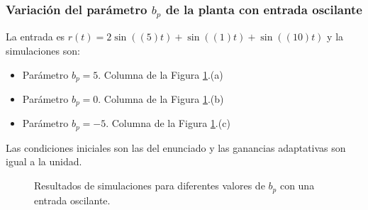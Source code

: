 \documentclass[letterpaper,11pt]{article} %
\begin{document}
\subsubsection{Variación del parámetro $b_p$ de la planta con entrada oscilante}
La entrada es $r(t) = 2\sin((5)t) + \sin((1)t) + \sin((10)t)$ y la simulaciones son:
\begin{itemize}
	\item Parámetro $b_p = 5$. Columna de la Figura \ref{parametrobO}.(a)
	\item Parámetro $b_p = 0$. Columna de la Figura \ref{parametrobO}.(b)
	\item Parámetro $b_p = -5$. Columna de la Figura \ref{parametrobO}.(c)
\end{itemize}
Las condiciones iniciales son las del enunciado y las ganancias adaptativas son igual a la unidad.
\newpage
\begin{figure}[h]
	\centering
	\captionsetup{justification=centering}
	\newline
	\noindent
	\newline
	\noindent
	\addtocounter{figure}{-1}  
	\caption{Resultados de simulaciones para diferentes valores de $b_p$ con una entrada oscilante.}
	\label{parametrobO}
\end{figure}
\end{document}
